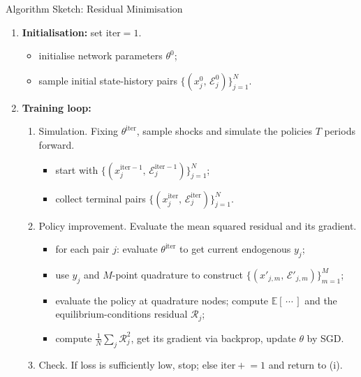\documentclass[aspectratio=169,11pt]{beamer}
\newcommand{\emphc}[1]{\textcolor{harvardcrimson}{#1}}
\newcommand{\E}{\mathcal{E}}
\begin{document}
\begin{frame}{Algorithm Sketch: Residual Minimisation}
\small
\begin{enumerate}
\item<1-> \textbf{Initialisation:} set $\text{iter} = 1$.
    \begin{itemize}
    \item<1-> initialise network parameters $\theta^0$;
    \item<1-> sample initial state-history pairs $\bigl\{(x^0_j,\,\E^0_j)\bigr\}_{j=1}^N$.
    \end{itemize}

\item<2-> \textbf{Training loop:}
    \begin{enumerate}
    \item<2-> \emphc{Simulation.}  Fixing $\theta^{\text{iter}}$, sample shocks and simulate the policies $T$ periods forward.
        \begin{itemize}
        \item<2-> start with $\bigl\{(x^{\text{iter}-1}_j,\,\E^{\text{iter}-1}_j)\bigr\}_{j=1}^N$;
        \item<2-> collect terminal pairs $\bigl\{(x^{\text{iter}}_j,\,\E^{\text{iter}}_j)\bigr\}_{j=1}^N$.
        \end{itemize}

    \item<3-> \emphc{Policy improvement.}  Evaluate the mean squared residual and its gradient.
        \begin{itemize}
        \item<3-> for each pair $j$: evaluate $\theta^{\text{iter}}$ to get current endogenous $y_j$;
        \item<4-> use $y_j$ and $M$-point quadrature to construct $\bigl\{(x'_{j,m},\,\E'_{j,m})\bigr\}_{m=1}^M$;
        \item<5-> evaluate the policy at quadrature nodes; compute $\mathbb{E}[\,\cdots\,]$ and the equilibrium-conditions residual $\mathcal{R}_j$;
        \item<6-> compute $\tfrac{1}{N}\sum_j \mathcal{R}_j^2$, get its gradient via backprop, update $\theta$ by SGD.
        \end{itemize}

    \item<7-> \emphc{Check.}  If loss is sufficiently low, stop; else $\text{iter} \mathrel{+}= 1$ and return to (i).
    \end{enumerate}
\end{enumerate}
\end{frame}
\end{document}
